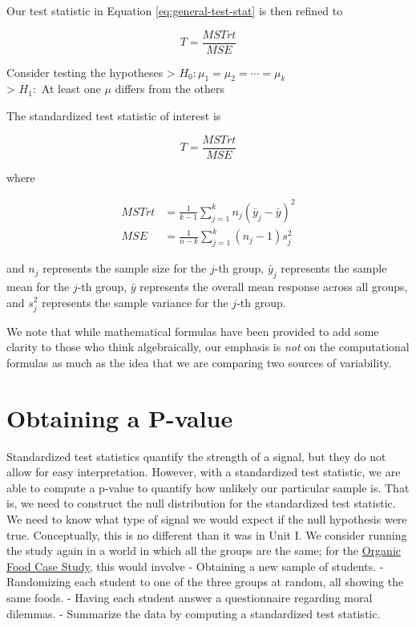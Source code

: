 \documentclass[]{book}
\theoremstyle{definition}
\theoremstyle{definition}
\theoremstyle{definition}
\theoremstyle{remark}
\let\BeginKnitrBlock\begin \let\EndKnitrBlock\end
\begin{document}
Our test statistic in Equation \eqref{eq:general-test-stat} is then
refined to

\begin{equation}
  T = \frac{MSTrt}{MSE}
  \label{eq:anova-test-stat}
\end{equation}

\BeginKnitrBlock{rmdtip}
Consider testing the hypotheses \textgreater{}
\(H_0: \mu_1 = \mu_2 = \dotsb = \mu_k\)\\
\textgreater{} \(H_1:\) At least one \(\mu\) differs from the others

The standardized test statistic of interest is

\[
  T = \frac{MSTrt}{MSE}
\]

where

\[
\begin{aligned}
  MSTrt &= \frac{1}{k-1} \sum_{j=1}^{k} n_j \left(\bar{y}_j - \bar{y}\right)^2 \\
  MSE &= \frac{1}{n-k} \sum_{j=1}^{k} \left(n_j - 1\right) s_j^2
\end{aligned}
\]

and \(n_j\) represents the sample size for the \(j\)-th group,
\(\bar{y}_j\) represents the sample mean for the \(j\)-th group,
\(\bar{y}\) represents the overall mean response across all groups, and
\(s_j^2\) represents the sample variance for the \(j\)-th group.
\EndKnitrBlock{rmdtip}

We note that while mathematical formulas have been provided to add some
clarity to those who think algebraically, our emphasis is \emph{not} on
the computational formulas as much as the idea that we are comparing two
sources of variability.

\section{Obtaining a P-value}\label{obtaining-a-p-value}

Standardized test statistics quantify the strength of a signal, but they
do not allow for easy interpretation. However, with a standardized test
statistic, we are able to compute a p-value to quantify how unlikely our
particular sample is. That is, we need to construct the null
distribution for the standardized test statistic. We need to know what
type of signal we would expect if the null hypothesis were true.
Conceptually, this is no different than it was in Unit I. We consider
running the study again in a world in which all the groups are the same;
for the \protect\hyperlink{CaseOrganic}{Organic Food Case Study}, this
would involve - Obtaining a new sample of students. - Randomizing each
student to one of the three groups at random, all showing the same
foods. - Having each student answer a questionnaire regarding moral
dilemmas. - Summarize the data by computing a standardized test
statistic.
\end{document}
